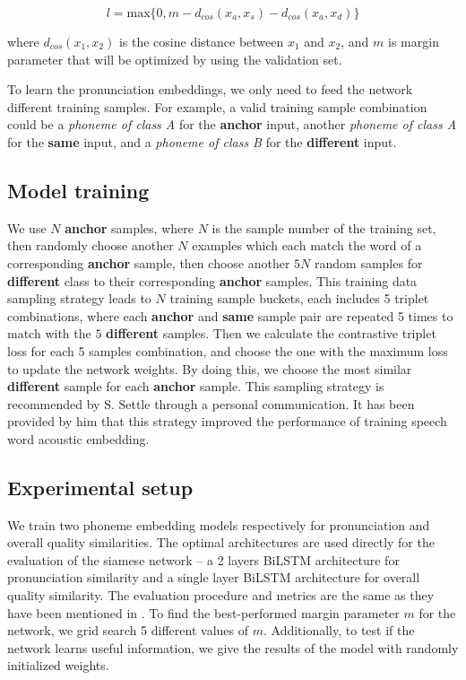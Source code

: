 \begin{equation}
l = \textrm{max}\{0,m-d_{cos}(x_a, x_s)-d_{cos}(x_a, x_d)\}
\end{equation}

where $d_{cos}(x_1, x_2)$ is the cosine distance between $x_1$ and $x_2$, and $m$ is margin parameter that will be optimized by using the validation set.

To learn the pronunciation embeddings, we only need to feed the network different training samples. For example, a valid training sample combination could be a \textit{phoneme of class A} for the \textbf{anchor} input, another \textit{phoneme of class A} for the \textbf{same} input, and a \textit{phoneme of class B} for the \textbf{different} input.

\subsection{Model training}

We use $N$ \textbf{anchor} samples, where $N$ is the sample number of the training set, then randomly choose another $N$ examples which each match the word of a corresponding \textbf{anchor} sample, then choose another $5N$ random samples for \textbf{different} class to their corresponding \textbf{anchor} samples. This training data sampling strategy leads to $N$ training sample buckets, each includes 5 triplet combinations, where each \textbf{anchor} and \textbf{same} sample pair are repeated 5 times to match with the $5$ \textbf{different} samples. Then we calculate the contrastive triplet loss for each 5 samples combination, and choose the one with the maximum loss to update the network weights. By doing this, we choose the most similar \textbf{different} sample for each \textbf{anchor} sample. This sampling strategy is recommended by S. Settle \cite{Settle2016a} through a personal communication. It has been provided by him that this strategy improved the performance of training speech word acoustic embedding.

\subsection{Experimental setup}

We train two phoneme embedding models respectively for pronunciation and overall quality similarities. The optimal architectures are used directly for the evaluation of the siamese network -- a 2 layers BiLSTM architecture for pronunciation similarity and a single layer BiLSTM architecture for overall quality similarity. The evaluation procedure and metrics are the same as they have been mentioned in . To find the best-performed margin parameter $m$ for the network, we grid search 5 different values of $m$. Additionally, to test if the network learns useful information, we give the results of the model with randomly initialized weights.

